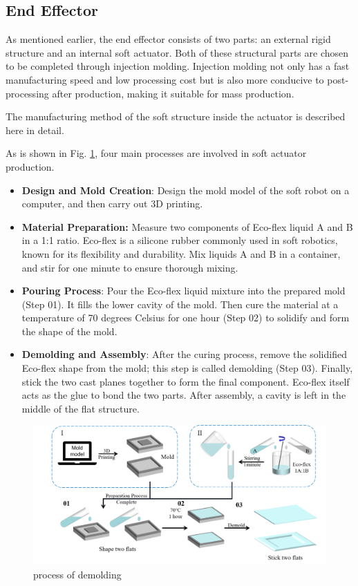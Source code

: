 \documentclass[10pt, a4paper, twocolumn]{article}
\begin{document}
\subsection{End Effector}
As mentioned earlier, the end effector consists of two parts: an external rigid structure and an internal soft actuator. Both of these structural parts are chosen to be completed through injection molding. Injection molding not only has a fast manufacturing speed and low processing cost but is also more conducive to post-processing after production, making it suitable for mass production.

The manufacturing method of the soft structure inside the actuator is described here in detail.

As is shown in Fig. \ref{fig:demolding_assembly}, four main processes are involved in soft actuator production.
\begin{itemize}
    \item \textbf{Design and Mold Creation}: Design the mold model of the soft robot on a computer, and then carry out 3D printing.
    \item \textbf{Material Preparation:} Measure two components of Eco-flex liquid A and B in a 1:1 ratio. Eco-flex is a silicone rubber commonly used in soft robotics, known for its flexibility and durability. Mix liquids A and B in a container, and stir for one minute to ensure thorough mixing.
    \item \textbf{Pouring Process}: Pour the Eco-flex liquid mixture into the prepared mold (Step 01). It fills the lower cavity of the mold. Then cure the material at a temperature of 70 degrees Celsius for one hour (Step 02) to solidify and form the shape of the mold.
    \item \textbf{Demolding and Assembly}: After the curing process, remove the solidified Eco-flex shape from the mold; this step is called demolding (Step 03). Finally, stick the two cast planes together to form the final component. Eco-flex itself acts as the glue to bond the two parts. After assembly, a cavity is left in the middle of the flat structure.
\end{itemize}

\begin{figure}
    \centering
    \includegraphics[width=\linewidth]{demolding and assembly.png}
    \caption{process of demolding}
    \label{fig:demolding_assembly}
\end{figure}
\end{document}

